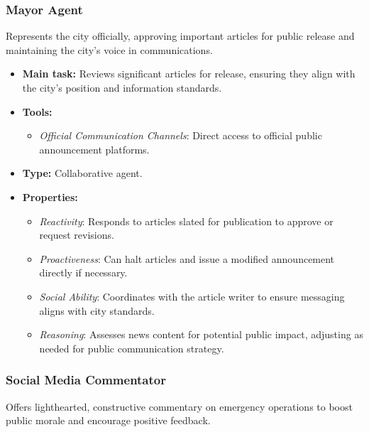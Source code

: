 \subsubsection{Mayor Agent}

Represents the city officially, approving important articles for public release and maintaining the city’s voice in communications.

\begin{itemize}
    \item \textbf{Main task:} Reviews significant articles for release, ensuring they align with the city’s position and information standards.
    \item \textbf{Tools:} 
    \begin{itemize}
        \item \emph{Official Communication Channels}: Direct access to official public announcement platforms.
    \end{itemize}
    \item \textbf{Type:} Collaborative agent.
    \item \textbf{Properties:}
    \begin{itemize}
        \item \emph{Reactivity}: Responds to articles slated for publication to approve or request revisions.
        \item \emph{Proactiveness}: Can halt articles and issue a modified announcement directly if necessary.
        \item \emph{Social Ability}: Coordinates with the article writer to ensure messaging aligns with city standards.
        \item \emph{Reasoning}: Assesses news content for potential public impact, adjusting as needed for public communication strategy.
    \end{itemize}
\end{itemize}

\subsubsection{Social Media Commentator}

Offers lighthearted, constructive commentary on emergency operations to boost public morale and encourage positive feedback.

